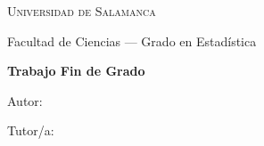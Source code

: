 \thispagestyle{empty}
\begin{titlepage}
\centering
\vspace*{1cm}
{\Large\textsc{Universidad de Salamanca}\par}
\vspace{0.3cm}
{\large Facultad de Ciencias --- Grado en Estadística\par}
\vfill
{\huge\bfseries Trabajo Fin de Grado\par}
\vspace{0.6cm}
{\LARGE\itshape \TFGTitulo\par}
\vspace{0.3cm}
{\large \TFGSubtitulo\par}
\vfill
{\large Autor: \TFGAutor\par}
{\large Tutor/a: \TFGTutor\par}
\vfill
{\large \TFGAnio\par}
\end{titlepage}
